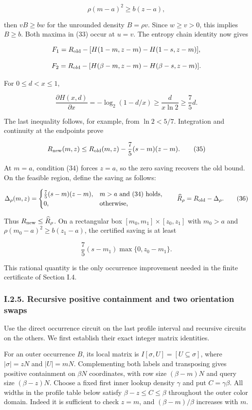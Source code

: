 \[
\rho(m-a)^2\ge b(z-a),
\tag{34}
\]

then \(vB\ge bw\) for the unrounded density \(B=\rho v\). Since \(w\ge v>0\), this implies \(B\ge b\). Both maxima in (33) occur at \(u=v\). The entropy chain identity now gives

\[
F_1=R_{\rm old}-[H(1-m,z-m)-H(1-s,z-m)],
\]

\[
F_2=R_{\rm old}-[H(\beta-m,z-m)-H(\beta-s,z-m)].
\]

For \(0\le d<x\le1\),

\[
\frac{\partial H(x,d)}{\partial x}
 =-\log_2(1-d/x)\ge \frac{d}{x\ln2}\ge\frac75d.
\]

The last inequality follows, for example, from \(\ln2<5/7\). Integration and continuity at the endpoints prove

\[
R_{\rm new}(m,z)\le
 R_{\rm old}(m,z)-\frac75(s-m)(z-m).
\tag{35}
\]

At \(m=a\), condition (34) forces \(z=a\), so the zero saving recovers the old bound. On the feasible region, define the saving as follows:

\[
\Delta_\rho(m,z)=
\begin{cases}
\frac75(s-m)(z-m),&m>a\text{ and (34) holds},\\
0,&\text{otherwise},
\end{cases}
\qquad
\widehat R_\rho=R_{\rm old}-\Delta_\rho.
\tag{36}
\]

Thus \(R_{\rm new}\le\widehat R_\rho\). On a rectangular box \([m_0,m_1]\times[z_0,z_1]\) with \(m_0>a\) and \(\rho(m_0-a)^2\ge b(z_1-a)\), the certified saving is at least

\[
\frac75(s-m_1)\max\{0,z_0-m_1\}.
\tag{37}
\]

This rational quantity is the only occurrence improvement needed in the finite certificate of Section I.4.

\hypertarget{af-a9ec399514-i.2.5.-recursive-positive-containment-and-two-orientation-swaps}{%
\subsubsection{I.2.5. Recursive positive containment and two orientation swaps}\label{af-a9ec399514-i.2.5.-recursive-positive-containment-and-two-orientation-swaps}}

Use the direct occurrence circuit on the last profile interval and recursive circuits on the others. We first establish their exact integer matrix identities.

For an outer occurrence \(B\), its local matrix is \(I[\sigma,U]=[U\subseteq\sigma]\), where \(|\sigma|=zN\) and \(|U|=mN\). Complementing both labels and transposing gives positive containment on \(\beta N\) coordinates, with row size \((\beta-m)N\) and query size \((\beta-z)N\). Choose a fixed first inner lookup density \(\gamma\) and put \(C=\gamma\beta\). All widths in the profile table below satisfy \(\beta-z\le C\le\beta\) throughout the outer color domain. Indeed it is sufficient to check \(z=m\), and \((\beta-m)/\beta\) increases with \(m\).

